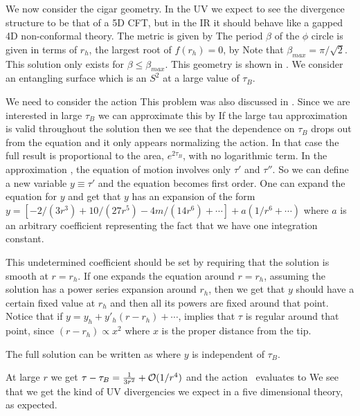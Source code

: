 We now consider the cigar geometry. In the UV we expect to see the divergence structure to be that of a 5D CFT, but in the IR it should behave like a gapped 4D non-conformal theory.
The   metric is given by
\eqn{}
The period $\beta$ of the $\phi$ circle is given in terms of $r_h$, the largest root of $f(r_h)=0$, by
\eqn{}
Note that $\beta_{max}=\pi/\sqrt{2}$. This solution only exists for  $\beta \leq  \beta_{max}$.
This geometry is shown in \schwads .
 We consider an entangling surface which is an $S^2$ at a large value of $\tau_B$.

We need to consider the action
\eqn{}
This problem was also discussed in \HubenyXT . 
Since we are interested in large $\tau_B$ we can approximate this by
\eqn{}
 If the large tau approximation is valid throughout the solution then we see that the dependence on $\tau_B$
drops out from the equation and it only appears normalizing the action. In that case the full result is proportional
to the area, $e^{ 2 \tau_B}$, with no logarithmic term.
In the approximation \acapp, the equation of motion involves only $\tau'$ and $\tau''$.
So we can define a new variable $y \equiv \tau'$ 
and the equation becomes first order.  One can expand the equation for $y$ and get that $y$ has an expansion of the form
$y = [-2/(3r^3) + 10/(27r^5) - 4m/(14r^6) +\cdots]+ a (1/r^6 + \cdots ) $ where $a$ is an arbitrary coefficient representing
the fact that we have one integration constant.

This undetermined coefficient should be set by requiring that the solution is
smooth at $r= r_h$.  If one expands the equation around $r=r_h$, assuming the solution has a power series
expansion around $r_h$, then we get that $y$ should have a certain fixed value at $r_h$ and then all its powers
are fixed around that point. Notice that if $y = y_h + y'_h (r-r_h) + \cdots$, implies that
$\tau$ is regular around that point, since $(r-r_h) \propto 
 x^2 $ where $x$ is the proper distance from the tip.

The full solution can be written as
\eqn{}
where $y$ is independent of $\tau_B$.

\ifig{} {}
At  large $r$  we get $
\tau - \tau_B  = { 1 \over 3 r^2 } + {\cal O}(1/r^4)
$
and the action \acapp\  evaluates to
\eqn{}
  We see that we get the kind of UV divergencies we expect in a five dimensional theory, as expected.
 
